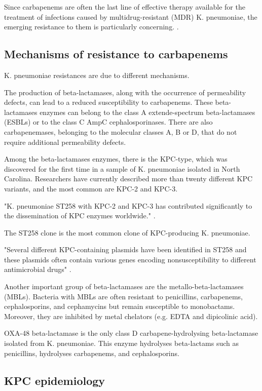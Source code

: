 \documentclass[11pt]{report}
\begin{document}
Since carbapenems are often the last line of effective therapy available for the treatment of infections caused by multidrug-resistant (MDR) K. pneumoniae, the emerging resistance to them is particularly concerning.
 \cite{Pitout2015}.

\subsection{Mechanisms of resistance to carbapenems} 


K. pneumoniae resistances are due to different mechanisms.

The production of beta-lactamases, along with the occurrence of permeability defects, can lead to a reduced susceptibility to carbapenems.
These beta-lactamases enzymes can belong to the class A extende-spectrum beta-lactamases (ESBLs) or to the class C AmpC cephalosporinases.
There are also carbapenemases, belonging to the molecular classes A, B or D, that do not require additional permeability defects.

Among the beta-lactamases enzymes, there is the KPC-type, which was discovered for the first time in a sample of K. pneumoniae isolated in North Carolina.
Researchers have currently described more than twenty different KPC variants, and the most common are KPC-2 and KPC-3.

"K. pneumoniae ST258 with KPC-2 and KPC-3 has contributed significantly to the dissemination of KPC enzymes worldwide."
\cite{Pitout2015}.

The ST258 clone is the most common clone of KPC-producing K. pneumoniae.

"Several different KPC-containing plasmids have been identified in ST258 and these plasmids often contain various genes encoding nonsusceptibility to different antimicrobial drugs" \cite{Pitout2015}.

Another important group of beta-lactamases are the metallo-beta-lactamases (MBLs).
Bacteria with MBLs are often resistant to penicillins, carbapenems, cephalosporins, and cephamycins but remain susceptible to monobactams. Moreover, they are inhibited by metal chelators (e.g. EDTA and dipicolinic acid).

OXA-48 beta-lactamase is the only class D carbapene-hydrolysing beta-lactamase isolated from K. pneumoniae.
This enzyme hydrolyses beta-lactams such as penicillins, hydrolyses carbapenems, and cephalosporins.


\subsection{KPC epidemiology}
\end{document}
